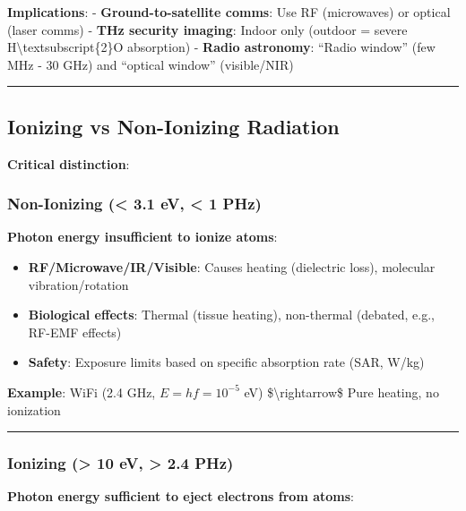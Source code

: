 \textbf{Implications}: - \textbf{Ground-to-satellite comms}: Use RF
(microwaves) or optical (laser comms) - \textbf{THz security imaging}:
Indoor only (outdoor = severe H\textbackslash textsubscript\{2\}O
absorption) - \textbf{Radio astronomy}: ``Radio window'' (few MHz - 30
GHz) and ``optical window'' (visible/NIR)

\begin{center}\rule{0.5\linewidth}{0.5pt}\end{center}

\subsection{Ionizing vs Non-Ionizing
Radiation}\label{ionizing-vs-non-ionizing-radiation}

\textbf{Critical distinction}:

\subsubsection{Non-Ionizing (\textless{} 3.1 eV, \textless{} 1
PHz)}\label{non-ionizing-3.1-ev-1-phz}

\textbf{Photon energy insufficient to ionize atoms}:

\begin{itemize}
\tightlist
\item
  \textbf{RF/Microwave/IR/Visible}: Causes heating (dielectric loss),
  molecular vibration/rotation
\item
  \textbf{Biological effects}: Thermal (tissue heating), non-thermal
  (debated, e.g., RF-EMF effects)
\item
  \textbf{Safety}: Exposure limits based on specific absorption rate
  (SAR, W/kg)
\end{itemize}

\textbf{Example}: WiFi (2.4 GHz, \(E = hf = 10^{-5}\) eV)
\$\textbackslash rightarrow\$ Pure heating, no ionization

\begin{center}\rule{0.5\linewidth}{0.5pt}\end{center}

\subsubsection{Ionizing (\textgreater{} 10 eV, \textgreater{} 2.4
PHz)}\label{ionizing-10-ev-2.4-phz}

\textbf{Photon energy sufficient to eject electrons from atoms}:

